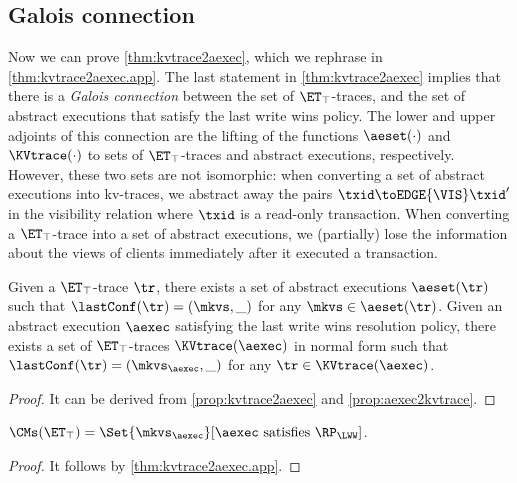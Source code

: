 \subsection{Galois connection}
\label{sec:galois-kv-aexec}
Now we can prove \cref{thm:kvtrace2aexec}, which we rephrase in \cref{thm:kvtrace2aexec.app}.
The last statement in \cref{thm:kvtrace2aexec} implies that there is a \emph{Galois connection}
between the set of $\ET_{\top}$-traces, and the set of abstract executions that satisfy the 
last write wins policy. The lower and upper adjoints of this connection are the 
lifting of the functions $\aeset(\cdot)$ and $\KVtrace(\cdot)$ to sets of $\ET_{\top}$-traces 
and abstract executions, respectively. However, these two sets are not isomorphic: 
when converting a set of abstract executions into kv-traces, we abstract away the 
pairs $\txid \toEDGE{\VIS} \txid'$ in the visibility relation where $\txid$ is a read-only transaction.
When converting a $\ET_{\top}$-trace into a set of abstract executions, 
we (partially) lose the information about the views of clients immediately after it executed a transaction.

\begin{theorem}
\label{thm:kvtrace2aexec.app}
Given a $\ET_{\top}$-trace $\tr$, there exists a set of abstract executions $\aeset({\tr})$ 
such that $\lastConf(\tr) = (\mkvs, \_)$ for any $\mkvs \in \aeset(\tr)$.
Given an abstract execution $\aexec$ satisfying the last write wins resolution policy,
there exists a set of $\ET_{\top}$-traces $\KVtrace({\aexec})$ in normal form
such that $\lastConf(\tr) = (\mkvs_{\aexec}, \_)$ for any $\tr \in \KVtrace({\aexec})$.
\end{theorem}
\begin{proof}
    It can be derived from \cref{prop:kvtrace2aexec} and \cref{prop:aexec2kvtrace}.
\end{proof}

\begin{corollary} 
\label{cor:kvtrace2aexec}
$\CMs(\ET_{\top}) = \Set{\mkvs_{\aexec} }[ \aexec \text{ satisfies } \RP_{\LWW}]$.
\end{corollary}
\begin{proof}
    It follows by \cref{thm:kvtrace2aexec.app}.
\end{proof}

